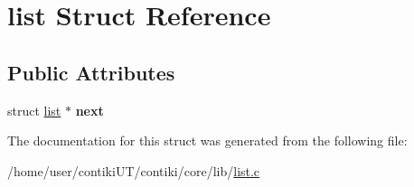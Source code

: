 \hypertarget{structlist}{}\section{list Struct Reference}
\label{structlist}
\subsection*{Public Attributes}
\begin{DoxyCompactItemize}
\item 
\hypertarget{structlist_a1900fe79e875e2838625b2eb60837f8f}{}struct \hyperlink{structlist}{list} $\ast$ {\bfseries next}\label{structlist_a1900fe79e875e2838625b2eb60837f8f}

\end{DoxyCompactItemize}


The documentation for this struct was generated from the following file\+:\begin{DoxyCompactItemize}
\item 
/home/user/contiki\+U\+T/contiki/core/lib/\hyperlink{list_8c}{list.\+c}\end{DoxyCompactItemize}
